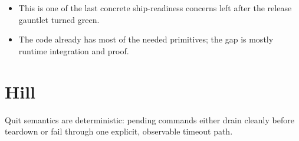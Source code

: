 \begin{itemize}
\tightlist
\item
  This is one of the last concrete ship-readiness concerns left after the release gauntlet turned green.
\item
  The code already has most of the needed primitives; the gap is mostly runtime integration and proof.
\end{itemize}

\section{Hill}\label{record-384-hill}

Quit semantics are deterministic: pending commands either drain cleanly before teardown or fail through one explicit, observable timeout path.

